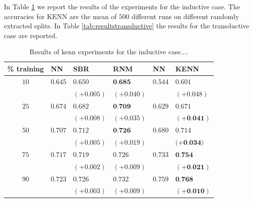 In Table \ref{tab:resultsinductive} we report the results of the experiments for the inductive case. The accuracies for KENN are the mean of $500$ different runs on different randomly extracted splits.
In Table \ref{tab:resultstransductive} the results for the transductive case are reported.
\begin{table}[h]
	\caption{Results of kenn experiments for the inductive case....}
	\label{tab:resultsinductive}
	\centering
	\begin{tabular}{c|lll|ll} 
	\% training & NN & SBR & RNM & NN & KENN \\
	\hline 
	\rule{0pt}{3ex}    $10$ & $0.645$ & $0.650$ & $\mathbf{0 . 6 8 5}$ & $0.544$ & $0.601$ \\
	& & $(+0.005)$ & $(+0.040)$ & & $\mathbf{(+0.048)}$ \\
	$25$ & $0.674$ & $0.682$ & $\mathbf{0 . 7 0 9}$ & $0.629$ & $0.671$ \\
	& & $(+0.008)$ & $(+0.035)$ & & $\mathbf{( + 0 . 0 4 1 )}$ \\
	$50$ & $0.707$ & $0.712$ & $\mathbf{0 . 7 2 6}$ & $0.680$ & $0.714$ \\
	& & $(+0.005)$ & $(+0.019)$ & & $(+\mathbf{0 . 0 3 4 )}$ \\
	$75$ & $0.717$ & $0.719$ & $0.726$ & $0.733$ & $\mathbf{0 . 7 5 4}$ \\
	& & $(+0.002)$ & $(+0.009)$ & & $\mathbf{( + 0 . 0 2 1 )}$ \\
	$90$ & $0.723$ & $0.726$ & $0.732$ & $0.759$ & $\mathbf{0 . 7 6 8}$ \\
	 & & $(+0.003)$ & $(+0.009)$ & & $\mathbf{( + 0 . 0 1 0 )}$\\	
	\hline \hline
\end{tabular}
\end{table}


